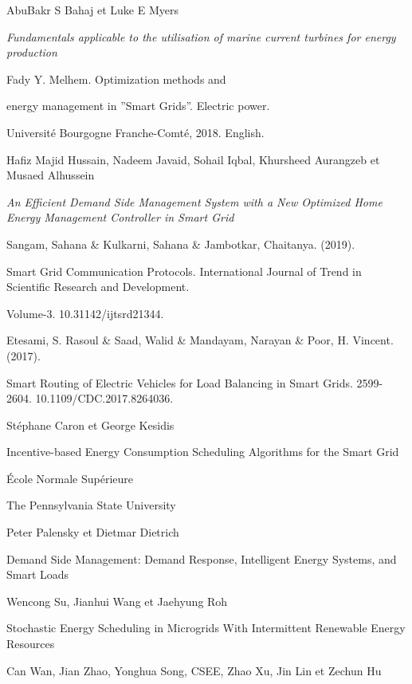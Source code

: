 \begin{thebibliography}{9}
  AbuBakr S Bahaj et Luke E Myers

  \textit{Fundamentals applicable to the utilisation of marine current turbines for energy production}

  Fady Y. Melhem. Optimization methods and

  energy management in ”Smart Grids”. Electric power.

  Université Bourgogne Franche-Comté, 2018. English.

  Hafiz Majid Hussain, Nadeem Javaid, Sohail Iqbal, Khursheed Aurangzeb et Musaed Alhussein

  \textit{An Efficient Demand Side Management System with a New Optimized Home Energy Management Controller in Smart Grid}

  Sangam, Sahana \& Kulkarni, Sahana \& Jambotkar, Chaitanya. (2019).

  Smart Grid Communication Protocols. International Journal of Trend in Scientific Research and Development.

  Volume-3. 10.31142/ijtsrd21344.

  Etesami, S. Rasoul \& Saad, Walid \& Mandayam, Narayan \& Poor, H. Vincent. (2017).

  Smart Routing of Electric Vehicles for Load Balancing in Smart Grids. 2599-2604. 10.1109/CDC.2017.8264036.

  Stéphane Caron et George Kesidis

  Incentive-based Energy Consumption Scheduling Algorithms for the Smart Grid

  École Normale Supérieure

  The Pennsylvania State University

  Peter Palensky et Dietmar Dietrich

  Demand Side Management: Demand Response, Intelligent Energy Systems, and Smart Loads

  Wencong Su, Jianhui Wang et Jaehyung Roh

  Stochastic Energy Scheduling in Microgrids With Intermittent Renewable Energy Resources


  Can Wan, Jian Zhao, Yonghua Song, CSEE, Zhao Xu, Jin Lin et Zechun Hu


\end{thebibliography}
